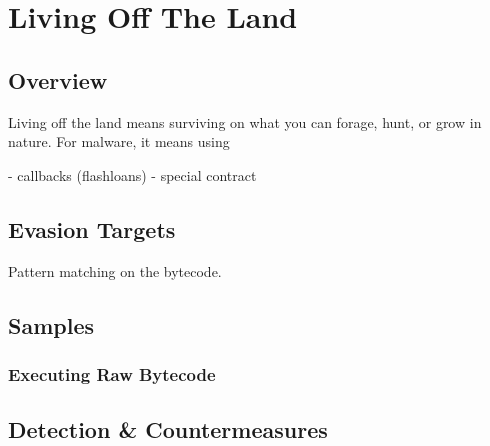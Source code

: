\section{Living Off The Land}

\subsection{Overview}

Living off the land means surviving on what you can forage, hunt, or grow in nature.
For malware, it means using 

- callbacks (flashloans)
- special contract

\subsection{Evasion Targets}

Pattern matching on the bytecode.

\subsection{Samples}

\subsubsection{Executing Raw Bytecode}

\subsection{Detection \& Countermeasures}
